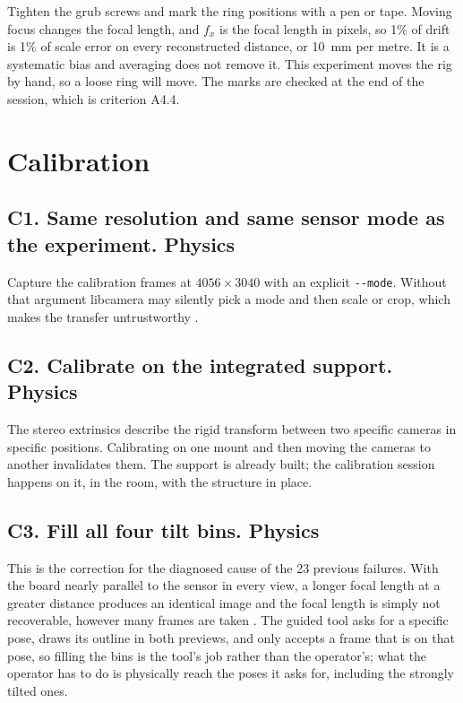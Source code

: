 Tighten the grub screws and mark the ring positions with a pen or tape.
Moving focus changes the focal length, and $f_x$ is the focal length in
pixels, so 1\% of drift is 1\% of scale error on every reconstructed distance,
or 10~mm per metre. It is a systematic bias and averaging does not remove it.
This experiment moves the rig by hand, so a loose ring will move. The marks
are checked at the end of the session, which is criterion A4.4.

\section{Calibration}

\subsection*{C1. Same resolution and same sensor mode as the experiment.
\textnormal{Physics}}

Capture the calibration frames at $4056 \times 3040$ with an explicit
\texttt{-{}-mode}. Without that argument libcamera may silently pick a mode
and then scale or crop, which makes the transfer untrustworthy
\cite{raspberrypi_camera_docs}.

\subsection*{C2. Calibrate on the integrated support. \textnormal{Physics}}

The stereo extrinsics describe the rigid transform between two specific
cameras in specific positions. Calibrating on one mount and then moving the
cameras to another invalidates them. The support is already built; the
calibration session happens on it, in the room, with the structure in place.

\subsection*{C3. Fill all four tilt bins. \textnormal{Physics}}

This is the correction for the diagnosed cause of the 23 previous failures.
With the board nearly parallel to the sensor in every view, a longer focal
length at a greater distance produces an identical image and the focal length
is simply not recoverable, however many frames are taken
\cite{zhang2000flexible, linku_calibration_method}. The guided tool asks for a
specific pose, draws its outline in both previews, and only accepts a frame
that is on that pose, so filling the bins is the tool's job rather than the
operator's; what the operator has to do is physically reach the poses it asks
for, including the strongly tilted ones.

